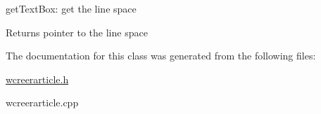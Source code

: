 get\+Text\+Box\+: get the line space 

\begin{DoxyReturn}{Returns}
pointer to the line space 
\end{DoxyReturn}


The documentation for this class was generated from the following files\+:\begin{DoxyCompactItemize}
\item 
\hyperlink{wcreerarticle_8h}{wcreerarticle.\+h}\item 
wcreerarticle.\+cpp\end{DoxyCompactItemize}
